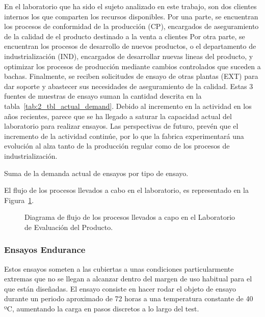 En el laboratorio que ha sido el sujeto analizado en este trabajo,
son dos clientes internos los que comparten los recursos disponibles.
Por una parte, se encuentran los procesos de conformidad de la producción (CP),
encargados de aseguramiento de la calidad
de el producto destinado a la venta a clientes
Por otra parte, se encuentran los procesos de desarrollo de nuevos productos,
o el departamento de industrialización (IND),
encargados de desarrollar nuevas lineas del producto,
y optimizar los procesos de producción
mediante cambios controlados que suceden a bachas.
Finalmente, se reciben solicitudes de ensayo de otras plantas (EXT) para dar soporte
y abastecer sus necesidades de aseguramiento de la calidad.
Estas 3 fuentes de muestras de ensayo
suman la cantidad descrita en la tabla~\ref{tab:2_tbl_actual_demand}.
Debido al incremento en la actividad en los años recientes,
parece que se ha llegado a saturar
la capacidad actual del laboratorio para realizar ensayos.
Las perspectivas de futuro, prevén que el incremento de la actividad continúe,
por lo que la fabrica experimentará una evolución al alza
tanto de la producción regular como de los procesos de industrialización.

\begin{table}
	\centering
	\caption{Suma de la demanda actual de ensayos por tipo de ensayo.}
	
	\label{tab:2_tbl_actual_demand}
\end{table}

El flujo de los procesos llevados a cabo en el laboratorio,
es representado en la Figura~\ref{fig:2_fc_lep_diagram}.

\begin{figure}
	\begin{center}
		
	\end{center}
	\caption{Diagrama de flujo de los procesos llevados a capo en el Laboratorio de Evaluación del Producto.}
	\label{fig:2_fc_lep_diagram}
\end{figure}

\subsubsection{Ensayos Endurance}
Estos ensayos someten a las cubiertas a unas condiciones particularmente extremas
que no se llegan a alcanzar dentro del margen de uso habitual
para el que están diseñadas.
El ensayo consiste en hacer rodar el objeto de ensayo
durante un periodo aproximado de 72 horas a una temperatura constante de 40 ºC,
aumentando la carga en pasos discretos a lo largo del test.

